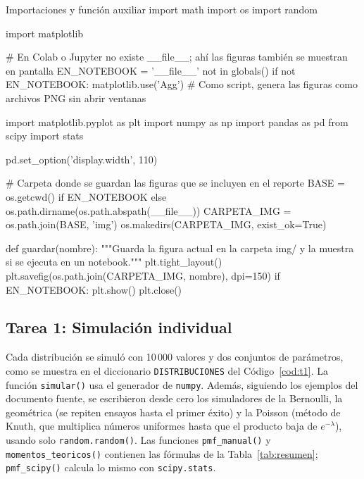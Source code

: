 \documentclass[11pt,letterpaper]{article}
\begin{document}
\begin{codigo}[label=cod:comun]{Importaciones y función auxiliar}
import math
import os
import random

import matplotlib

# En Colab o Jupyter no existe __file__; ahí las figuras también se muestran en pantalla
EN_NOTEBOOK = '__file__' not in globals()
if not EN_NOTEBOOK:
    matplotlib.use('Agg')  # Como script, genera las figuras como archivos PNG sin abrir ventanas

import matplotlib.pyplot as plt
import numpy as np
import pandas as pd
from scipy import stats

pd.set_option('display.width', 110)

# Carpeta donde se guardan las figuras que se incluyen en el reporte
BASE = os.getcwd() if EN_NOTEBOOK else os.path.dirname(os.path.abspath(__file__))
CARPETA_IMG = os.path.join(BASE, 'img')
os.makedirs(CARPETA_IMG, exist_ok=True)


def guardar(nombre):
    """Guarda la figura actual en la carpeta img/ y la muestra si se ejecuta en un notebook."""
    plt.tight_layout()
    plt.savefig(os.path.join(CARPETA_IMG, nombre), dpi=150)
    if EN_NOTEBOOK:
        plt.show()
    plt.close()
\end{codigo}

\subsection{Tarea 1: Simulación individual}

Cada distribución se simuló con 10\,000 valores y dos conjuntos de parámetros, como se muestra en el diccionario \texttt{DISTRIBUCIONES} del Código~\ref{cod:t1}. La función \texttt{simular()} usa el generador de \texttt{numpy}. Además, siguiendo los ejemplos del documento fuente, se escribieron desde cero los simuladores de la Bernoulli, la geométrica (se repiten ensayos hasta el primer éxito) y la Poisson (método de Knuth, que multiplica números uniformes hasta que el producto baja de $e^{-\lambda}$), usando solo \texttt{random.random()}. Las funciones \texttt{pmf\_manual()} y \texttt{momentos\_teoricos()} contienen las fórmulas de la Tabla~\ref{tab:resumen}; \texttt{pmf\_scipy()} calcula lo mismo con \texttt{scipy.stats}.
\end{document}
